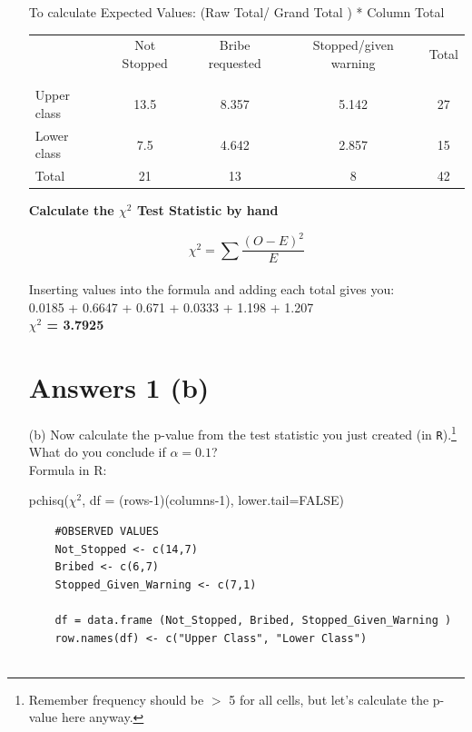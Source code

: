 \documentclass[12pt,letterpaper]{article}
\begin{document}
\begin{enumerate}
To calculate Expected Values: (Raw Total/ Grand Total ) * Column Total \\ 

\begin{table}[h!]
	\centering
	\begin{tabular}{l | c c c c }
		& Not Stopped & Bribe requested & Stopped/given warning & Total \\
		\\[-1.8ex] 
		\hline \\[-1.8ex]
		Upper class & 13.5 & 8.357 & 5.142 & 27 \\
		Lower class & 7.5 & 4.642 & 2.857 & 15 \\
		\hline
		Total & 21 & 13 & 8 & 42 \\
		\hline
	\end{tabular}
\end{table}

\textbf{Calculate the $\chi^2$ Test Statistic by hand}

$$\chi^2 = \sum \frac {(O - E)^2}{E}$$ \\

Inserting values into the formula and adding each total gives you: \\

0.0185 + 0.6647 + 0.671 + 0.0333 + 1.198 + 1.207 \\

\textbf{$\chi^2$ = 3.7925 } \\

\section*{Answers 1 (b)}

	\item [(b)]
	Now calculate the p-value from the test statistic you just created (in \texttt{R}).\footnote{Remember frequency should be $>$ 5 for all cells, but let's calculate the p-value here anyway.}  What do you conclude if $\alpha = 0.1$?\\

Formula in R: 

pchisq($\chi^2$, df = (rows-1)(columns-1), lower.tail=FALSE) \\

\begin{verbatim}
	#OBSERVED VALUES
	Not_Stopped <- c(14,7)
	Bribed <- c(6,7)
	Stopped_Given_Warning <- c(7,1)
	
	df = data.frame (Not_Stopped, Bribed, Stopped_Given_Warning )
	row.names(df) <- c("Upper Class", "Lower Class")
	

\end{verbatim}
\end{enumerate}
\end{document}
